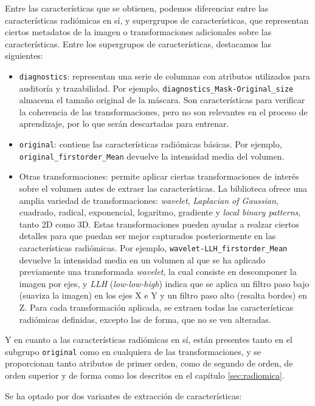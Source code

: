 Entre las características que se obtienen, podemos diferenciar entre las características radiómicas en sí, y supergrupos de características, que representan ciertos metadatos de la imagen o transformaciones adicionales sobre las características. Entre los supergrupos de características, destacamos las siguientes:

\begin{itemize}
    \item \texttt{diagnostics}: representan una serie de columnas con atributos utilizados para auditoría y trazabilidad. Por ejemplo, \texttt{diagnostics\_Mask-Original\_size} almacena el tamaño original de la máscara. Son características para verificar la coherencia de las transformaciones, pero no son relevantes en el proceso de aprendizaje, por lo que serán descartadas para entrenar.
    \item \texttt{original}: contiene las características radiómicas básicas. Por ejemplo, \texttt{original\_firstorder\_Mean} devuelve la intensidad media del volumen.
    \item Otras transformaciones: permite aplicar ciertas transformaciones de interés sobre el volumen antes de extraer las características. La biblioteca ofrece una amplia variedad de transformaciones: \emph{wavelet}, \emph{Laplacian of Gaussian}, cuadrado, radical, exponencial, logaritmo, gradiente y \emph{local binary patterns}, tanto 2D como 3D. Estas transformaciones pueden ayudar a realzar ciertos detalles para que puedan ser mejor capturados posteriormente en las características radiómicas. Por ejemplo, \texttt{wavelet-LLH\_firstorder\_Mean} devuelve la intensidad media en un volumen al que se ha aplicado previamente una transformada \emph{wavelet}, la cual consiste en descomponer la imagen por ejes, y \emph{LLH} (\emph{low-low-high}) indica que se aplica un filtro paso bajo (suaviza la imagen) en los ejes X e Y y un filtro paso alto (resalta bordes) en Z. Para cada transformación aplicada, se extraen todas las características radiómicas definidas, excepto las de forma, que no se ven alteradas.
\end{itemize}

Y en cuanto a las características radiómicas en sí, están presentes tanto en el subgrupo \texttt{original} como en cualquiera de las transformaciones, y se proporcionan tanto atributos de primer orden, como de segundo de orden, de orden superior y de forma como los descritos en el capítulo \ref{sec:radiomica}.

Se ha optado por dos variantes de extracción de características:

